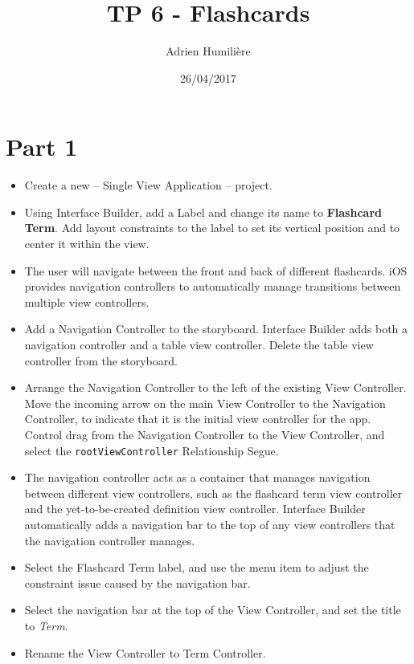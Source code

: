 \documentclass[a4paper,11pt]{scrartcl}
\begin{document}
\newcommand{\mytitle}{TP 6 - Flashcards}
\title{\mytitle}
\author{Adrien Humilière}
\date{26/04/2017}

\maketitle

\section*{Part 1}

\begin{itemize}
\item Create a new – Single View Application – project.
\item Using Interface Builder, add a Label and change its name to \textbf{Flashcard Term}. Add layout constraints to the label to set its vertical position and to center it within the view.
\item The user will navigate between the front and back of different flashcards. iOS provides navigation controllers to automatically manage transitions between multiple view controllers.
\item Add a Navigation Controller to the storyboard. Interface Builder adds both a navigation controller and a table view controller. Delete the table view controller from the storyboard.
\item Arrange the Navigation Controller to the left of the existing View Controller. Move the incoming arrow on the main View Controller to the Navigation Controller, to indicate that it is the initial view controller for the app. Control drag from the Navigation Controller to the View Controller, and select the \texttt{rootViewController} Relationship Segue.
\item The navigation controller acts as a container that manages navigation between different view controllers, such as the flashcard term view controller and the yet-to-be-created definition view controller. Interface Builder automatically adds a navigation bar to the top of any view controllers that the navigation controller manages.
\item Select the Flashcard Term label, and use the  menu item to adjust the constraint issue caused by the navigation bar.
\item Select the navigation bar at the top of the View Controller, and set the title to \textit{Term}.
\item Rename the View Controller to Term Controller.

\end{itemize}
\end{document}
